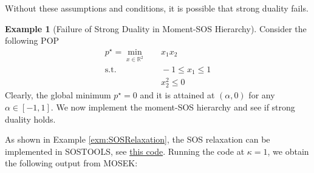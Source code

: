 \documentclass[
]{book}
\theoremstyle{definition}
\theoremstyle{definition}
\newtheorem{example}{Example}[chapter]
\theoremstyle{definition}
\theoremstyle{definition}
\theoremstyle{remark}
\begin{document}
Without these assumptions and conditions, it is possible that strong duality fails.

\begin{example}[Failure of Strong Duality in Moment-SOS Hierarchy]
\protect\hypertarget{exm:FailureStrongDualityMomentSOS}{}\label{exm:FailureStrongDualityMomentSOS}Consider the following POP
\begin{equation}
\begin{split}
p^\star = \min_{x \in \mathbb{R}^{2}} & \quad x_1 x_2 \\
\mathrm{s.t.}& \quad -1 \leq x_1 \leq 1 \\
& \quad x_2^2 \leq 0
\end{split}
\end{equation}
Clearly, the global minimum \(p^\star = 0\) and it is attained at \((\alpha,0)\) for any \(\alpha \in [-1,1]\). We now implement the moment-SOS hierarchy and see if strong duality holds.

As shown in Example \ref{exm:SOSRelaxation}, the SOS relaxation can be implemented in SOSTOOLS, see \href{https://github.com/ComputationalRobotics/Semidefinite-Examples/blob/main/example_pop_no_strong_duality.m}{this code}. Running the code at \(\kappa = 1\), we obtain the following output from MOSEK:


\end{example}
\end{document}
